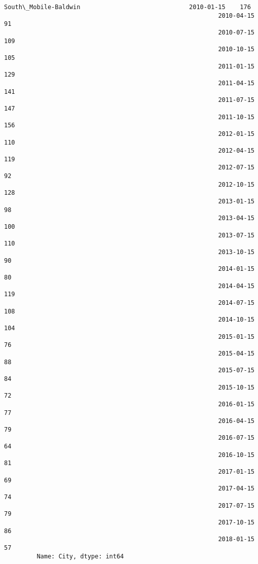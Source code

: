 \documentclass[11pt]{article}
\begin{document}
\begin{Verbatim}[commandchars=\\\{\}]
         South\_Mobile-Baldwin                              2010-01-15    176
                                                           2010-04-15     91
                                                           2010-07-15    109
                                                           2010-10-15    105
                                                           2011-01-15    129
                                                           2011-04-15    141
                                                           2011-07-15    147
                                                           2011-10-15    156
                                                           2012-01-15    110
                                                           2012-04-15    119
                                                           2012-07-15     92
                                                           2012-10-15    128
                                                           2013-01-15     98
                                                           2013-04-15    100
                                                           2013-07-15    110
                                                           2013-10-15     90
                                                           2014-01-15     80
                                                           2014-04-15    119
                                                           2014-07-15    108
                                                           2014-10-15    104
                                                           2015-01-15     76
                                                           2015-04-15     88
                                                           2015-07-15     84
                                                           2015-10-15     72
                                                           2016-01-15     77
                                                           2016-04-15     79
                                                           2016-07-15     64
                                                           2016-10-15     81
                                                           2017-01-15     69
                                                           2017-04-15     74
                                                           2017-07-15     79
                                                           2017-10-15     86
                                                           2018-01-15     57
         Name: City, dtype: int64
\end{Verbatim}
            
\end{document}
